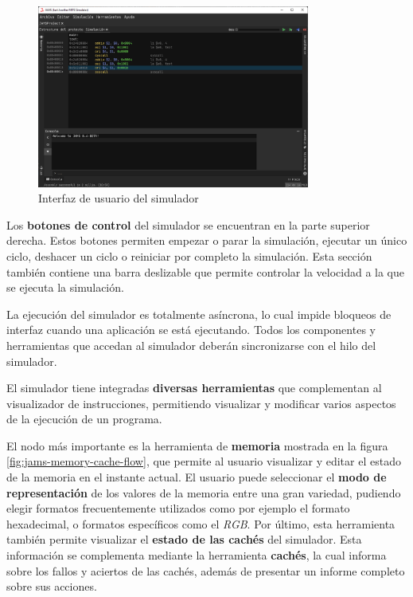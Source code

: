 \begin{figure}[h]
    \centering
    \includegraphics[width=0.8\textwidth]{images/mips/jams-simulation}
    \caption{Interfaz de usuario del simulador}
    \label{fig:jams-simulation}
\end{figure}

Los \textbf{botones de control} del simulador se encuentran
en la parte superior derecha.
Estos botones permiten empezar o parar la simulación, ejecutar un
único ciclo, deshacer un ciclo o reiniciar por completo la simulación.
Esta sección también contiene una barra deslizable que permite controlar
la velocidad a la que se ejecuta la simulación.

La ejecución del simulador es totalmente asíncrona, lo cual
impide bloqueos de interfaz cuando una aplicación se está ejecutando.
Todos los componentes y herramientas que accedan al simulador
deberán sincronizarse con el hilo del simulador.

El simulador tiene integradas \textbf{diversas herramientas} que complementan
al visualizador de instrucciones, permitiendo visualizar y modificar varios
aspectos de la ejecución de un programa.

El nodo más importante es la herramienta de \textbf{memoria}
mostrada en la figura \ref{fig:jams-memory-cache-flow},
que permite al usuario visualizar y editar el estado de la memoria
en el instante actual.
El usuario puede seleccionar el \textbf{modo de representación} de los valores
de la memoria entre una gran variedad, pudiendo elegir formatos
frecuentemente utilizados como por ejemplo el formato hexadecimal,
o formatos específicos como el \textit{RGB}.
Por último, esta herramienta también permite visualizar el \textbf{estado
de las cachés} del simulador.
Esta información se complementa mediante la herramienta \textbf{cachés},
la cual informa sobre los fallos y aciertos de las cachés,
además de presentar un informe completo sobre sus acciones.

